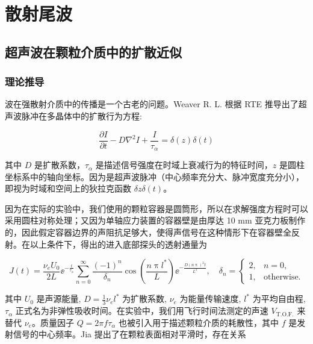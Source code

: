 
\chapter{散射尾波}

\section{超声波在颗粒介质中的扩散近似}

\subsection{理论推导}

波在强散射介质中的传播是一个古老的问题。Weaver R. L. 根据 RTE 推导出了超声波脉冲在多晶体中的扩散行为方程\cite{diffusivity}:

\begin{equation}
  \frac{\partial I}{\partial t} - D\nabla^{2}I + \frac{I}{\tau_{\alpha}} = \delta(z)\delta(t)
\end{equation}

其中 $D$ 是扩散系数，$\tau_{\alpha}$ 是描述信号强度在时域上衰减行为的特征时间，$z$ 是圆柱坐标系中的轴向坐标。因为是超声波脉冲（中心频率充分大、脉冲宽度充分小），即视为时域和空间上的狄拉克函数 $\delta{z}\delta(t)$。

因为在实际的实验中，我们使用的颗粒容器是圆筒形，所以在求解强度方程时可以采用圆柱对称处理；又因为单轴应力装置的容器壁是由厚达 10 \unit{\milli\meter} 亚克力板制作的，因此假定容器边界的声阻抗足够大，使得声信号在这种情形下在容器壁全反射。在以上条件下，得出的进入底部探头的透射通量\cite{PhysRevLett.93.154303}为

\begin{equation}
  J(t) = \frac{\nu_{e} U_{0}}{2L}{\ee}^{-\frac{t}{\tau_{\alpha}}}\sum_{n=0}^{\infty}\frac{(-1)^{n}}{\delta_{n}}\cos{\left(\frac{n\uppi l^{*}}{L}\right)}{\ee}^{-\frac{D(n\uppi)^{2}t}{L^{2}}},\quad \delta_{n} = \begin{cases}
    2, & n = 0, \\
    1, & \text{otherwise}.
  \end{cases}
\end{equation}

其中 $U_{0}$ 是声源能量, $D = \frac{1}{3}\nu_{e}l^{*}$ 为扩散系数, $\nu_{e}$ 为能量传输速度, $l^{*}$ 为平均自由程, $\tau_{\alpha}$ 正式名为非弹性吸收时间。在实验中，我们用飞行时间法测定的声速 $V_{\text{T.O.F.}}$ 来替代 $\nu_{e}$。质量因子 $Q = 2\pi f\tau_{\alpha}$ 也被引入用于描述颗粒介质的耗散性，其中 $f$ 是发射信号的中心频率。Jia 提出了在颗粒表面相对平滑时，存在关系\cite{PhysRevLett.101.138001}

